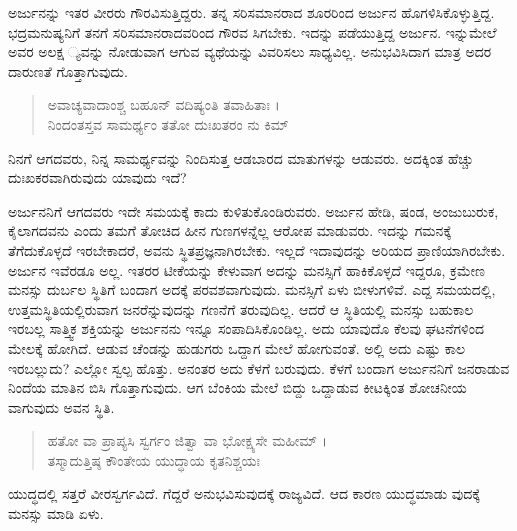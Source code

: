 ಅರ್ಜುನನ್ನು ಇತರ ವೀರರು ಗೌರವಿಸುತ್ತಿದ್ದರು. ತನ್ನ ಸರಿಸಮಾನರಾದ ಶೂರರಿಂದ ಅರ್ಜುನ ಹೊಗಳಿಸಿಕೊಳ್ಳುತ್ತಿದ್ದ. ಭದ್ರಮನುಷ್ಯನಿಗೆ ತನಗೆ ಸರಿಸಮಾನರಾದವರಿಂದ ಗೌರವ ಸಿಗಬೇಕು. ಇದನ್ನು ಪಡೆಯುತ್ತಿದ್ದ ಅರ್ಜುನ. ಇನ್ನುಮೇಲೆ ಅವರ ಅಲಕ್ಷ ್ಯವನ್ನು ನೋಡುವಾಗ ಆಗುವ ವ್ಯಥೆಯನ್ನು ವಿವರಿಸಲು ಸಾಧ್ಯವಿಲ್ಲ. ಅನುಭವಿಸಿದಾಗ ಮಾತ್ರ ಅದರ ದಾರುಣತೆ ಗೊತ್ತಾಗುವುದು.

\begin{verse}
ಅವಾಚ್ಯವಾದಾಂಶ್ಚ ಬಹೂನ್ ವದಿಷ್ಯಂತಿ ತವಾಹಿತಾಃ ।\\ನಿಂದಂತಸ್ತವ ಸಾಮರ್ಥ್ಯಂ ತತೋ ದುಃಖತರಂ ನು ಕಿಮ್ 
\end{verse}

{\small ನಿನಗೆ ಆಗದವರು, ನಿನ್ನ ಸಾಮರ್ಥ್ಯವನ್ನು ನಿಂದಿಸುತ್ತ ಆಡಬಾರದ ಮಾತುಗಳನ್ನು ಆಡುವರು. ಅದಕ್ಕಿಂತ ಹೆಚ್ಚು ದುಃಖಕರವಾಗಿರುವುದು ಯಾವುದು ಇದೆ?}

ಅರ್ಜುನನಿಗೆ ಆಗದವರು ಇದೇ ಸಮಯಕ್ಕೆ ಕಾದು ಕುಳಿತುಕೊಂಡಿರುವರು. ಅರ್ಜುನ ಹೇಡಿ, ಷಂಡ, ಅಂಜುಬುರುಕ, ಕೈಲಾಗದವನು ಎಂದು ತಮಗೆ ತೋಚಿದ ಹೀನ ಗುಣಗಳನ್ನೆಲ್ಲ ಆರೋಪ ಮಾಡುವರು. ಇದನ್ನು ಗಮನಕ್ಕೆ ತೆಗೆದುಕೊಳ್ಳದೆ ಇರಬೇಕಾದರೆ, ಅವನು ಸ್ಥಿತಪ್ರಜ್ಞನಾಗಿರಬೇಕು. ಇಲ್ಲದೆ ಇದಾವುದನ್ನು ಅರಿಯದ ಪ್ರಾಣಿಯಾಗಿರಬೇಕು. ಅರ್ಜುನ ಇವೆರಡೂ ಅಲ್ಲ. ಇತರರ ಟೀಕೆಯನ್ನು ಕೇಳುವಾಗ ಅದನ್ನು ಮನಸ್ಸಿಗೆ ಹಾಕಿಕೊಳ್ಳದೆ ಇದ್ದರೂ, ಕ್ರಮೇಣ ಮನಸ್ಸು ದುರ್ಬಲ ಸ್ಥಿತಿಗೆ ಬಂದಾಗ ಅದಕ್ಕೆ ಪರವಶವಾಗುವುದು. ಮನಸ್ಸಿಗೆ ಏಳು ಬೀಳುಗಳಿವೆ. ಎದ್ದ ಸಮಯದಲ್ಲಿ, ಉತ್ತಮಸ್ಥಿತಿಯಲ್ಲಿರುವಾಗ ಜನರೆನ್ನುವುದನ್ನು ಗಣನೆಗೆ ತರುವುದಿಲ್ಲ. ಆದರೆ ಆ ಸ್ಥಿತಿಯಲ್ಲಿ ಮನಸ್ಸು ಬಹುಕಾಲ ಇರಬಲ್ಲ ಸಾತ್ತ್ವಿಕ ಶಕ್ತಿಯನ್ನು ಅರ್ಜುನನು ಇನ್ನೂ ಸಂಪಾದಿಸಿಕೊಂಡಿಲ್ಲ. ಅದು ಯಾವುದೊ ಕೆಲವು ಘಟನೆಗಳಿಂದ ಮೇಲಕ್ಕೆ ಹೋಗಿದೆ. ಆಡುವ ಚೆಂಡನ್ನು ಹುಡುಗರು ಒದ್ದಾಗ ಮೇಲೆ ಹೋಗುವಂತೆ. ಅಲ್ಲಿ ಅದು ಎಷ್ಟು ಕಾಲ ಇರಬಲ್ಲುದು? ಎಲ್ಲೋ ಸ್ವಲ್ಪ ಹೊತ್ತು. ಅನಂತರ ಅದು ಕೆಳಗೆ ಬರುವುದು. ಕೆಳಗೆ ಬಂದಾಗ ಅರ್ಜುನನಿಗೆ ಜನರಾಡುವ ನಿಂದೆಯ ಮಾತಿನ ಬಿಸಿ ಗೊತ್ತಾಗುವುದು. ಆಗ ಬೆಂಕಿಯ ಮೇಲೆ ಬಿದ್ದು ಒದ್ದಾಡುವ ಕೀಟಕ್ಕಿಂತ ಶೋಚನೀಯ ವಾಗುವುದು ಅವನ ಸ್ಥಿತಿ.

\begin{verse}
ಹತೋ ವಾ ಪ್ರಾಪ್ಯಸಿ ಸ್ವರ್ಗಂ ಜಿತ್ವಾ ವಾ ಭೋಕ್ಷ್ಯಸೇ ಮಹೀಮ್ ।\\ತಸ್ಮಾದುತ್ತಿಷ್ಠ ಕೌಂತೇಯ ಯುದ್ಧಾಯ ಕೃತನಿಶ್ಚಯಃ 
\end{verse}

{\small ಯುದ್ಧದಲ್ಲಿ ಸತ್ತರೆ ವೀರಸ್ವರ್ಗವಿದೆ. ಗೆದ್ದರೆ ಅನುಭವಿಸುವುದಕ್ಕೆ ರಾಜ್ಯವಿದೆ. ಆದ ಕಾರಣ ಯುದ್ಧಮಾಡು ವುದಕ್ಕೆ ಮನಸ್ಸು ಮಾಡಿ ಏಳು.}

